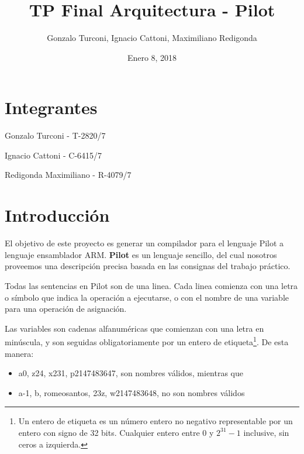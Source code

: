\documentclass[12pt,spanish]{article}
\begin{document}
 
 
\title{TP Final Arquitectura - Pilot}
\author{Gonzalo Turconi, Ignacio Cattoni, Maximiliano Redigonda}
\date{Enero 8, 2018}
 
\maketitle

\section{Integrantes}

Gonzalo Turconi - T-2820/7

\noindent
Ignacio Cattoni - C-6415/7

\noindent
Redigonda Maximiliano - R-4079/7
\section{Introducción}
El objetivo de este proyecto es generar un compilador para el lenguaje Pilot a lenguaje ensamblador ARM. \textbf{Pilot} es un lenguaje sencillo, del cual nosotros proveemos una descripción precisa basada en las consignas del trabajo práctico.

Todas las sentencias en Pilot son de una linea. Cada linea comienza con una letra o símbolo que indica la operación a ejecutarse, o con el nombre de una variable para una operación de asignación.

Las variables son cadenas alfanuméricas que comienzan con una letra en minúscula, y son seguidas obligatoriamente por un entero de etiqueta\footnote{Un entero de etiqueta es un número entero no negativo representable por un entero con signo de 32 bits. Cualquier entero entre $0$ y $2^{31}-1$ inclusive, sin ceros a izquierda.}. De esta manera:
\begin{itemize}
\item{a0, z24, x231, p2147483647, son nombres válidos, mientras que}
\item{a-1, b, romeosantos, 23z, w2147483648, no son nombres válidos}
\end{itemize}
\end{document}
